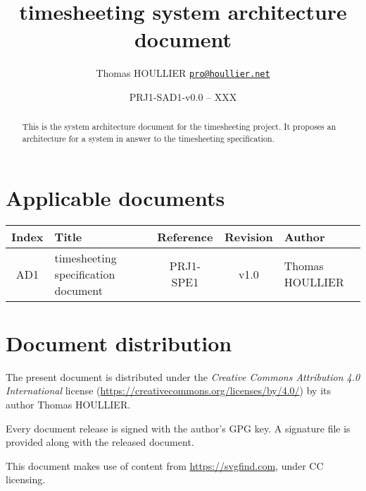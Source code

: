 \documentclass[letterpaper]{article}
\title{timesheeting system architecture document}
\author{Thomas HOULLIER \href{mailto:pro@houllier.net}
         {\texttt{\textlangle pro@houllier.net\textrangle}}}
\begin{document}
\frenchspacing
\date{PRJ1-SAD1-v0.0 -- XXX}
\maketitle
\thispagestyle{FirstPage}

\begin{abstract}
  This is the system architecture document for the timesheeting project.
  It proposes an architecture for a system in answer to the timesheeting
  specification.
\end{abstract}

\begin{versionhistory}
\end{versionhistory}
\setcounter{table}{0} %

\section*{Applicable documents}
{ \centering
\begin{tabularx}{\textwidth}{| c | X | c | c | X |} \hline
  Index & Title & Reference & Revision & Author \\ \hline
  AD1   & timesheeting specification document & PRJ1-SPE1 & v1.0 & Thomas HOULLIER \\
  \hline \end{tabularx} \par }

\section*{Document distribution}
The present document is distributed under the \emph{Creative Commons Attribution
4.0 International} license (\url{https://creativecommons.org/licenses/by/4.0/})
by its author Thomas HOULLIER.

Every document release is signed with the author's GPG key. A signature file
is provided along with the released document.

This document makes use of content from \url{https://svgfind.com}, under
CC licensing.

\tableofcontents
\printglossary[type=\acronymtype,style=index]
\pagestyle{plain}




\appendix


\apptocmd{\thebibliography}{\raggedright}{}{}
\begingroup
{}
\setlength\bibitemsep{0pt}
\printbibliography
\endgroup
\end{document}
